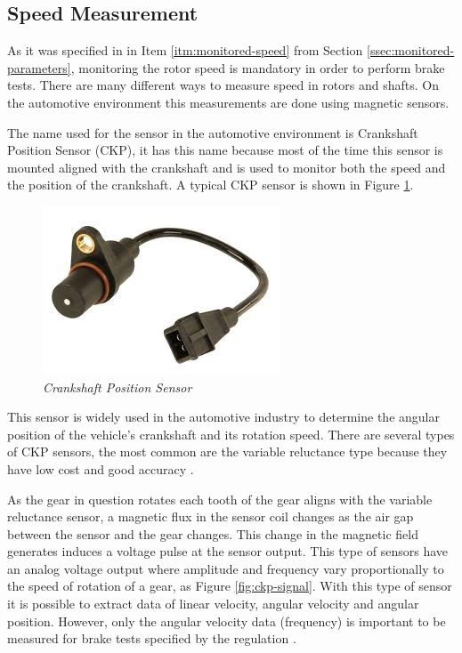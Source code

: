 \subsection{Speed Measurement}\label{ssec:speedMeasurement}
	
	As it was specified in in Item \ref{itm:monitored-speed} from Section \ref{ssec:monitored-parameters}, monitoring the rotor speed is mandatory in order to perform brake tests. There are many different ways to measure speed in rotors and shafts. On the automotive environment this measurements are done using magnetic sensors.
	\par
	The name used for the sensor in the automotive environment is Crankshaft Position Sensor (CKP), it has this name because most of the time this sensor is mounted aligned with the crankshaft and is used to monitor both the speed and the position of the crankshaft. A typical CKP sensor is shown in Figure \ref{fig-ckpReal}.

	\begin{figure}[htbp]
		\centering
		\includegraphics[width=.8\textwidth]{figuras/fig-ckp-real.jpg}
		\caption{\textit{Crankshaft Position Sensor} \cite{ckp-gm}}
		\label{fig-ckpReal}
	\end{figure}

	This sensor is widely used in the automotive industry to determine the angular position of the vehicle's crankshaft and its rotation speed. There are several types of CKP sensors, the most common are the variable reluctance type because they have low cost and good accuracy \cite{schroeder2002crankshaft}.
	\par
	As the gear in question rotates each tooth of the gear aligns with the variable reluctance sensor, a magnetic flux in the sensor coil changes as the air gap between the sensor and the gear changes. This change in the magnetic field generates induces a voltage pulse at the sensor output. This type of sensors have an analog voltage output where amplitude and frequency vary proportionally to the speed of rotation of a gear, as Figure \ref{fig:ckp-signal}. With this type of sensor it is possible to extract data of linear velocity, angular velocity and angular position. However, only the angular velocity data (frequency) is important to be measured for brake tests specified by the regulation \cite{saej2522}. 


